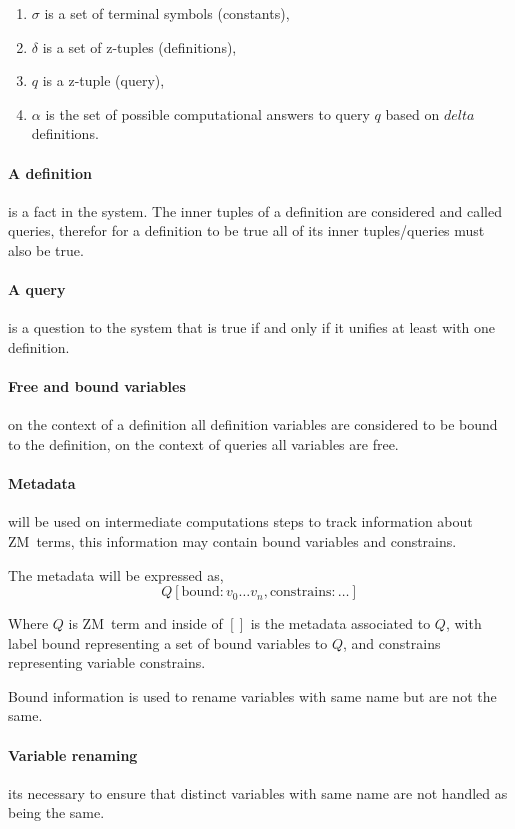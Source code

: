 \documentclass[11pt,a4paper]{report}
\newcommand{\zm}{ZM}
\begin{document}
\begin{enumerate}
\item $\sigma$ is a set of terminal symbols (constants),
\item $\delta$ is a set of z-tuples (definitions),
\item $q$ is a z-tuple (query),
\item $\alpha$ is the set of possible computational answers to query $q$ based on $delta$ definitions.
\end{enumerate}


\paragraph{A definition} is a fact in the system. The inner tuples of a definition are considered and called queries, therefor 
for a definition to be true all of its inner tuples/queries must also be true.

\paragraph{A query} is a question to the system that is true if and only if it unifies at least with 
one definition.

\paragraph{Free and bound variables} on the context of a definition all definition variables are considered 
to be bound to the definition, on the context of queries all variables are free.

\paragraph{Metadata} will be used on intermediate computations steps to track information about \zm\ terms, 
this information may contain bound variables and constrains.

The metadata will be expressed as,
\[
    Q[\text{bound}: v_{0} \ldots v_{n}, \text{constrains}: \ldots ]
\]

Where $Q$ is \zm\ term and inside of $[]$ is the metadata associated to $Q$, with label bound representing a set of bound variables to $Q$, and constrains representing 
variable constrains.


Bound information is used to rename variables with same name but are not the same.

\paragraph{Variable renaming} its necessary to ensure that distinct variables with same name are not handled as being the same.
\end{document}

